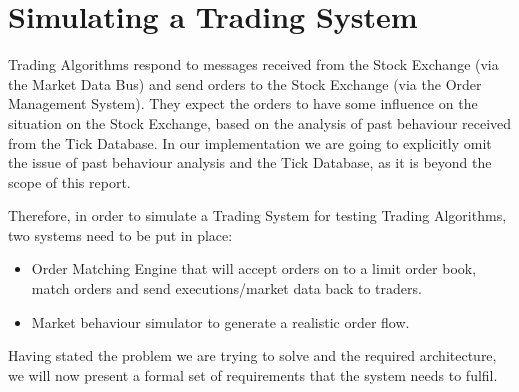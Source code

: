 \section{Simulating a Trading System}

Trading Algorithms respond to messages received from the Stock Exchange (via the Market Data Bus) and send orders to the Stock Exchange (via the Order Management System). They expect the orders to have some influence on the situation on the Stock Exchange, based on the analysis of past behaviour received from the Tick Database. In our implementation we are going to explicitly omit the issue of past behaviour analysis and the Tick Database, as it is beyond the scope of this report. 

Therefore, in order to simulate a Trading System for testing Trading Algorithms, two systems need to be put in place:
\begin{itemize}
\item Order Matching Engine that will accept orders on to a limit order book, match orders and send executions/market data back to traders.
\item Market behaviour simulator to generate a realistic order flow. \end{itemize}

Having stated the problem we are trying to solve and the required architecture, we will now present a formal set of requirements that the system needs to fulfil.
